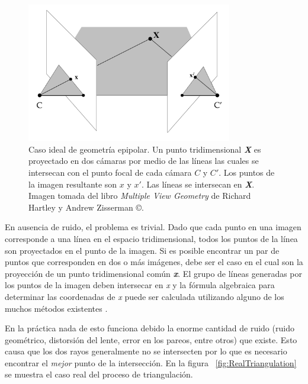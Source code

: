 \begin{figure}[H]
\centering
\includegraphics[width=0.8\textwidth]{images/idealtriangulation.png}
\caption[Caso ideal del proceso de triangulaci\'{o}n]%
{Caso ideal de geometr\'{i}a epipolar. Un punto tridimensional \textit{\textbf{X}} es proyectado en dos c\'{a}maras por medio de las l\'{i}neas las cuales se intersecan con el punto focal de cada c\'{a}mara \textbf{\textit{$C$}} y \textbf{\textit{$C'$}}. Los puntos de la imagen resultante son \textbf{\textit{$x$}} y \textbf{\textit{$x'$}}. Las l\'{i}neas se intersecan en \textit{\textbf{X}}. Imagen tomada del libro \textit{Multiple View Geometry} de Richard Hartley y Andrew Zisserman \copyright.}
\label{fig:IdealTriangulation}
\end{figure}

En ausencia de ruido, el problema es trivial. Dado que cada punto en una imagen corresponde a una l\'{i}nea en el espacio tridimensional, todos los puntos de la l\'{i}nea son proyectados en el punto de la imagen. Si es posible encontrar un par de puntos que corresponden en dos o m\'{a}s im\'{a}genes, debe ser el caso en el cual son la proyecci\'{o}n de un punto tridimensional com\'{u}n \textbf{\textit{x}}. El grupo de l\'{i}neas generadas por los puntos de la imagen deben intersecar en \textit{x} y la f\'{o}rmula algebraica para determinar las coordenadas de \textit{x} puede ser calculada utilizando alguno de los muchos m\'{e}todos existentes \cite{hartley1997triangulation,Hartley_Zisserman_2003,Faugeras_1993}.

En la pr\'{a}ctica nada de esto funciona debido la enorme cantidad de ruido (ruido geom\'{e}trico, distorsi\'{o}n del lente, error en los pareos, entre otros) que existe. Esto causa que los dos rayos generalmente no se intersecten por lo que es necesario encontrar el \textit{mejor} punto de la intersecci\'{o}n. En la figura ~\ref{fig:RealTriangulation} se muestra el caso real del proceso de triangulaci\'{o}n.


